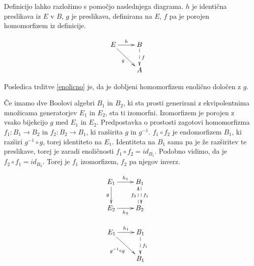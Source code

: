 \documentclass{amsart}
\begin{document}
Definicijo lahko razložimo s pomočjo naslednjega diagrama. $h$ je identična preslikava iz $E$ v $B$,
$g$ je preslikava, definirana na $E$, $f$ pa je porojen homomorfizem
iz definicije.

\begin{equation*}
  \xymatrix{
    {E}
    \ar[r]^{h}
    \ar[dr]_{g}
    &
    {B}
    \ar@{-->}[d]^f
    \\
    &
    {A}
  }
\end{equation*}

Posledica trditve \ref{enolicno} je, da je dobljeni homomorfizem enolično
določen z $g$.

Če imamo dve Boolovi algebri $B_1$ in $B_2$, ki sta prosti generirani
z ekvipolentnima množicama generatorjev $E_1$ in $E_2$,
sta ti izomorfni. Izomorfizem 
je porojen z vsako bijekcijo $g$ med $E_1$ in $E_2$.
Predpostavka o prostosti zagotovi homomorfizma \(f_1: B_1 \to B_2\) in \(f_2: B_2 \to B_1\),
ki razširita \(g\) in \(g^{-1}\). \(f_1 \circ f_2\) je endomorfizem
$B_1$, ki razširi \(g^{-1} \circ g\), torej identiteto na $E_1$. Identiteta na $B_1$ sama
pa je že razširitev te preslikave, torej je zaradi enoličnosti
\(f_1 \circ f_2 = id_{B_1}\). Podobno vidimo, da je \(f_2 \circ f_1 = id_{B_2}\).
Torej je \(f_1\) izomorfizem, \(f_2\) pa njegov inverz.



\begin{table*}[!htb]
    \begin{minipage}{.5\linewidth}
      \centering
        \begin{equation*}
            \xymatrix{
            {E_1}
            \ar[r]^{h_1}
            \ar@{->}[d]_{g}
            &
            {B_1}
            \ar@<0.5ex>@{-->}[d]^{f_1}
            \\
            {E_2}
            \ar[r]_{h_2}
            &
            {B_2}   
            \ar@<0.5ex>@{-->}[u]^{f_2}
            }
        \end{equation*}
    \end{minipage}%
    \begin{minipage}{.5\linewidth}
      \centering
        \begin{equation*}
            \xymatrix{
              {E_1}
              \ar[r]^{h_1}
              \ar@{->}[dr]_{g^{-1} \circ g}
              &
              {B_1}
              \ar@{-->}[d]^{f_1}
              \\
              &
              {B_1}      
            }
        \end{equation*}
    \end{minipage} 
\end{table*}
\end{document}

